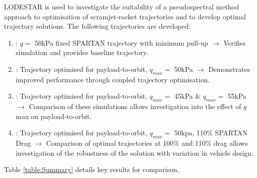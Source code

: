 LODESTAR is used to investigate the suitability of a pseudospectral method approach to optimisation of scramjet-rocket trajectories and to develop optimal trajectory solutions. The following trajectories are developed: 
\begin{enumerate}
	\item: $q = $ 50kPa fixed SPARTAN trajectory with minimum pull-up \newline$\rightarrow$ Verifies simulation and provides baseline trajectory.
	\item: Trajectory optimised for payload-to-orbit, $q_{max} = $ 50kPa \newline$\rightarrow$ Demonstrates improved performance through coupled trajectory optimisation.
	\item: Trajectory optimised for payload-to-orbit, $q_{max} = $ 45kPa \& $q_{max} = $ 55kPa \newline$\rightarrow$ Comparison of these simulations allows investigation into the effect of $q$ max on payload-to-orbit.
	\item: Trajectory optimised for payload-to-orbit,  $q_{max} = $ 50kpa, 110\% SPARTAN Drag \newline$\rightarrow$ Comparison of optimal trajectories at 100\% and 110\% drag allows investigation of the robustness of the solution with variation in vehicle design. 
\end{enumerate}

Table \ref{table:Summary} details key results for comparison. 



